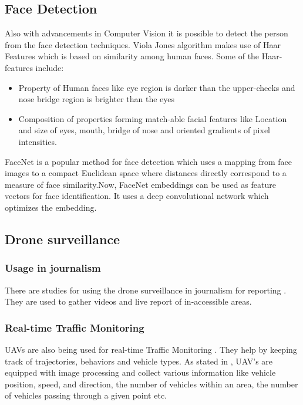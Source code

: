 \documentclass[10pt,twocolumn,letterpaper]{article}
\begin{document}
\subsection{Face Detection}
Also with advancements in Computer Vision it is possible to detect the person from the face detection techniques. Viola Jones algorithm \cite{viola2001robust} makes use of Haar Features which is based on similarity among human faces. Some of the Haar- features include:
\begin{itemize}
\item Property of Human faces like eye region is darker than the upper-cheeks and nose bridge region is brighter than the eyes
\item Composition of properties forming match-able facial features like Location and size of eyes, mouth, bridge of nose and oriented gradients of pixel intensities.
\end{itemize}

 FaceNet \cite{schroff2015facenet}is a popular method for face detection which uses a mapping from face images to a compact Euclidean space where distances directly correspond to a measure of face similarity.Now, FaceNet embeddings can be used as feature vectors for face identification. It uses a deep convolutional network which optimizes the embedding.

\subsection{Drone surveillance } 
\subsubsection{Usage in journalism} 
There are studies for using the  drone surveillance in journalism for reporting \cite{gynnild2014robot}. They are used to gather videos and live report of in-accessible areas. \\
\subsubsection{Real-time Traffic Monitoring} 
 UAVs are also being used for real-time Traffic Monitoring \cite{8377077}. They help by keeping track of trajectories, behaviors and vehicle types. As stated in \cite{8377077}, UAV's are equipped with image processing and collect various information like vehicle position, speed, and direction, the number of vehicles within an area, the number of vehicles passing through a given point etc.\\
\end{document}

